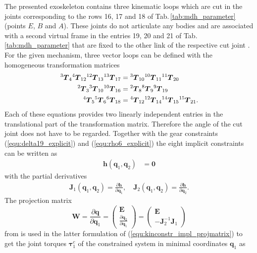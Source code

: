 \documentclass[letterpaper, 10 pt, conference]{ieeeconf}  %
\newcommand{\bm}[1]{\boldsymbol{#1}}
\renewcommand{\vec}[1]{\mbox{\boldmath{$#1$}}}
\newcommand{\tmat}[2]{{^{\mathrm{#1}}\vec{T}_{\mathrm{#2}}}}
\begin{document}
The presented exoskeleton contains three kinematic loops which are cut in the joints corresponding to the rows 16, 17 and 18 of Tab.\,\ref{tab:mdh_parameter} (points $E$, $B$ and $A$).
These joints do not articulate any bodies and are associated with a second virtual frame in the entries 19, 20 and 21 of Tab.\,\ref{tab:mdh_parameter} that are fixed to the other link of the respective cut joint \cite{KhalilBen1995,SaminFis2013}.
For the given mechanism, three vector loops can be defined with the homogeneous transformation matrices
%
\begin{align}
\tmat{3}{4} \tmat{4}{12} \tmat{12}{13} \tmat{13}{17} &= \tmat{3}{10} \tmat{10}{11} \tmat{11}{20} \label{equ:implconstr_chain1} \\
\tmat{2}{3} \tmat{3}{10} \tmat{10}{16}  &= \tmat{2}{8} \tmat{8}{9} \tmat{9}{19} \label{equ:implconstr_chain2} \\
\tmat{4}{5} \tmat{5}{6} \tmat{6}{18}  &= \tmat{4}{12} \tmat{12}{14} \tmat{14}{15} \tmat{15}{21}.
\label{equ:implconstr_chain3}
\end{align}
%
Each of these equations provides two linearly independent entries in the translational part of the transformation matrix.
Therefore the angle of the cut joint does not have to be regarded.
Together with the gear constraints (\ref{equ:delta19_explicit}) and (\ref{equ:rho6_explicit}) the eight implicit constraints can be written as
%
\begin{align}
\bm{h}(\bm{q}_1, \bm{q}_2) &= \bm{0} \label{equ:kinconstr_implicit}
\end{align}
%
with the partial derivatives
%
\begin{align}
\bm{J}_1(\bm{q}_1, \bm{q}_2)=\frac{\partial\bm{h}}{\partial \bm{q}_1}, \quad 
\bm{J}_2(\bm{q}_1, \bm{q}_2)=\frac{\partial\bm{h}}{\partial \bm{q}_2}. \label{equ:kinconstr_impl_grad}
\end{align}
%
The projection matrix
%
\begin{equation}
\bm{W} = \frac{\partial \bm{q}}{\partial \bm{q}_1} 
= \begin{pmatrix} \bm{E}\\ \frac{\partial \bm{q}_2}{\partial \bm{q}_1} \end{pmatrix}
= \begin{pmatrix} \bm{E}\\ -\bm{J}_2^{-1}\bm{J}_1 \end{pmatrix}
\label{equ:kinconstr_impl_projmatrix}
\end{equation}
%
from \cite{NakamuraGho1989,ParkChoPlo1999} is used in the latter formulation of (\ref{equ:kinconstr_impl_projmatrix}) to get the joint torques $\bm{\tau}^c_1$ of the constrained system in minimal coordinates $\bm{q}_1$ as
\end{document}
